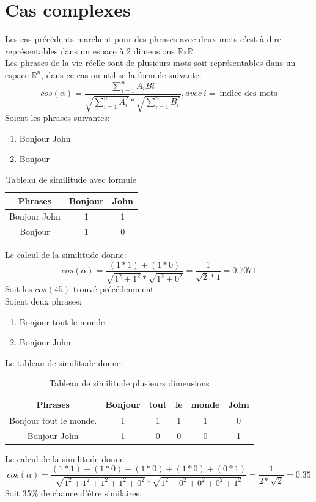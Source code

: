 \documentclass[a4paper, 14pt]{article}
\begin{document}
    \section{Cas complexes}
    Les cas précédents marchent pour des phrases avec deux mots c'est à dire représentables dans un espace à 2 dimensions $\mathds{R} \text{x} \mathds{R}$. \\
    Les phrases de la vie réelle sont de plusieurs mots soit représentables dans un espace $\mathds{R}^{n}$, dans ce cas on utilise la formule suivante:
   	\[
   		cos(\alpha) = \frac{\sum_{i=1}^{n}A_{i}B{i}}{\sqrt{\sum_{i=1}^{n}A_{i}^{2}} * \sqrt{\sum_{i=1}^{n}B_{i}^{2}}}, avec \ i = \  \text{indice des mots}
   	\]
   	Soient les phrases suivantes:
   	\begin{enumerate}
   		\item Bonjour John
   		\item Bonjour
   	\end{enumerate}
   	 \begin{table}[H]
   		\centering
   		\begin{tabular}{|c|c|c|}
   			\hline
   			\textbf{Phrases} & \textbf{Bonjour} & \textbf{John} \\
   			\hline
   			Bonjour John & 1 & 1 \\
   			Bonjour  & 1 & 0 \\
   			\hline
   		\end{tabular}
   		\caption{Tableau de similitude avec formule}
   		\label{tab:similitude}
   	\end{table}
   	Le calcul de la similitude donne:
   	\[
   		cos(\alpha) = \frac{(1*1) + (1*0)}{\sqrt{1^{2} + 1^{2}} * \sqrt{1^{2} + 0^{2}}} = \frac{1}{\sqrt{2} * 1} = 0.7071
   	\]
   	Soit les $cos(45)$ trouvé précédemment.\\
   	Soient deux phrases:
  	\begin{enumerate}
  		\item Bonjour tout le monde.
  		\item Bonjour John
  	\end{enumerate}
  	Le tableau de similitude donne:
  	\begin{table}[H]
  		\centering
  		\begin{tabular}{|c|c|c|c|c|c|}
  			\hline
  			\textbf{Phrases} & \textbf{Bonjour} & \textbf{tout} & \textbf{le} & \textbf{monde} & \textbf{John}\\
  			\hline
  			Bonjour tout le monde. & 1 & 1 & 1 & 1 & 0 \\
  			Bonjour  John & 1 & 0 & 0 & 0 & 1 \\
  			\hline
  		\end{tabular}
  		\caption{Tableau de similitude plusieurs dimensions}
  		\label{tab:similitudecomplexe}
  	\end{table}
	Le calcul de la similitude donne:
	\[
		cos(\alpha) = \frac{(1*1) + (1*0) + (1*0) + (1*0) + (0*1)}{\sqrt{1^{2} + 1^{2} +  1^{2} +  1^{2} + 0^{2}} * \sqrt{1^{2} + 0^{2} + 0^{2} + 0^{2} + 1^{2}}} = \frac{1}{2 * \sqrt{2}} = 0.35
	\]
	Soit 35\% de chance d'être similaires.
\end{document}
